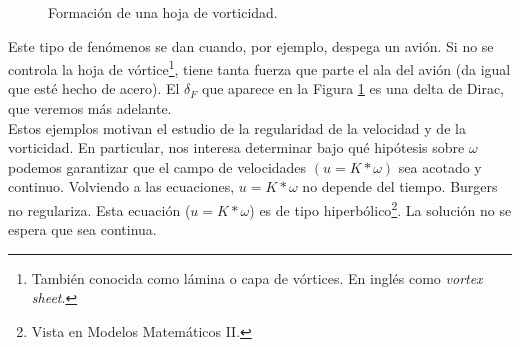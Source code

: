 \begin{figure}[H]
\begin{center}
    \caption{Formación de una hoja de vorticidad.}
    \label{fig:f34}
    \end{center}
\end{figure}

Este tipo de fenómenos se dan cuando, por ejemplo, despega un avión. Si no se controla la hoja de vórtice\footnote{También conocida como lámina o capa de vórtices. En inglés como \textit{vortex sheet}.}, 
tiene tanta fuerza que parte el ala del avión (da igual que esté hecho de acero). El $\delta_F$ que aparece en la Figura \ref{fig:f34} es una delta de Dirac, que veremos más adelante. \\

Estos ejemplos motivan el estudio de la regularidad de la velocidad y de la vorticidad. En particular, nos interesa determinar bajo qué hipótesis sobre 
$\omega$ podemos garantizar que el campo de velocidades $(u=K*\omega)$ sea acotado y continuo. Volviendo a las ecuaciones, $u = K \ast \omega$ no depende del tiempo. 
Burgers no regulariza. Esta ecuación ($u = K \ast \omega$) es de tipo hiperbólico\footnote{Vista en Modelos Matemáticos II.}. La solución no se espera que sea continua. \\

